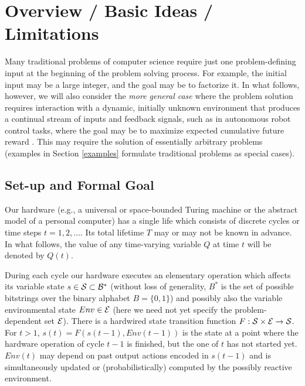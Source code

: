\section{Overview / Basic Ideas /  Limitations}
\label{basics}

Many traditional problems of computer science require just
one problem-defining input at the beginning of the problem solving
process.  For example, the initial input may be a large integer,
and the goal may be to factorize it.
In what follows, however, we will
also consider the {\em more general case}
where the problem solution requires interaction with a dynamic,
initially unknown environment that produces a continual stream of
inputs and feedback
signals, such as in autonomous robot control tasks,
where the goal may be to maximize expected cumulative
future reward \cite{Kaelbling:96}.
This may require the solution of essentially arbitrary problems
(examples in Section \ref{examples} formulate traditional
problems as special cases).

\subsection{Set-up and Formal Goal}
\label{notation}
Our hardware (e.g., a universal or space-bounded
Turing machine 
\cite{Turing:36} 
or the abstract model
of a personal computer) 
has a single life which
consists of discrete cycles or time steps $t=1, 2, \ldots$.
Its total lifetime $T$ may or may not be known in advance.
In what follows, the value of any time-varying variable $Q$
at time $t$ will be denoted by $Q(t)$.

During each cycle our hardware 
executes an elementary operation which affects its 
variable state $s \in \cal S \subset B^*$
(without loss of generality, $B^*$ is
the set of possible bitstrings over 
the binary alphabet $B=\{ 0, 1 \}$)
and possibly also the variable environmental state $Env \in \cal E$ 
(here we need not yet specify the problem-dependent set $\cal E$).
There is a hardwired
state transition function $F: \cal S \times \cal E \rightarrow \cal S$. 
For $t > 1$, $s(t)=F(s(t-1), Env(t-1))$ is the state at a point where
the hardware operation of cycle $t-1$ is finished, but the one of
$t$ has not started yet.
$Env(t)$ may depend on past output actions encoded in $s(t-1)$ and 
is simultaneously updated or (probabilistically) computed by 
the possibly reactive environment.

